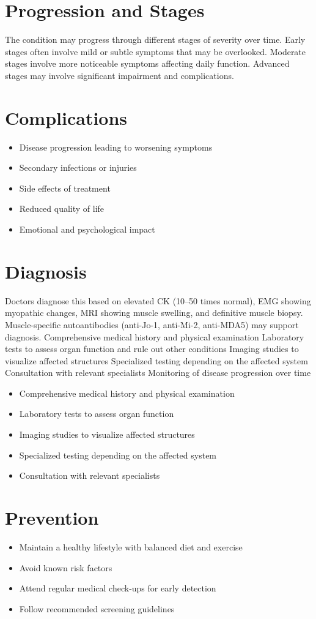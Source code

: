 \section{Progression and Stages}
The condition may progress through different stages of severity over time. Early stages often involve mild or subtle symptoms that may be overlooked. Moderate stages involve more noticeable symptoms affecting daily function. Advanced stages may involve significant impairment and complications.
\section{Complications}
\begin{itemize}[noitemsep]
  \item Disease progression leading to worsening symptoms
  \item Secondary infections or injuries
  \item Side effects of treatment
  \item Reduced quality of life
  \item Emotional and psychological impact
\end{itemize}
\section{Diagnosis}
Doctors diagnose this based on elevated CK (10--50 times normal), EMG showing myopathic changes, MRI showing muscle swelling, and definitive muscle biopsy. Muscle-specific autoantibodies (anti-Jo-1, anti-Mi-2, anti-MDA5) may support diagnosis. Comprehensive medical history and physical examination Laboratory tests to assess organ function and rule out other conditions Imaging studies to visualize affected structures Specialized testing depending on the affected system Consultation with relevant specialists Monitoring of disease progression over time

\begin{itemize}[noitemsep]
  \item Comprehensive medical history and physical examination
  \item Laboratory tests to assess organ function
  \item Imaging studies to visualize affected structures
  \item Specialized testing depending on the affected system
  \item Consultation with relevant specialists
\end{itemize}
\section{Prevention}
\begin{itemize}[noitemsep]
  \item Maintain a healthy lifestyle with balanced diet and exercise
  \item Avoid known risk factors
  \item Attend regular medical check-ups for early detection
  \item Follow recommended screening guidelines
\end{itemize}
